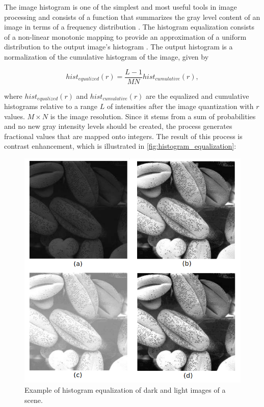 The image histogram is one of the simplest and most useful tools in image processing and consists of a function that summarizes the gray level content of an image in terms of a frequency distribution \cite{castleman1996digital}. The histogram equalization consists of a non-linear monotonic mapping to provide an approximation of a uniform distribution to the output image's histogram \cite{gonzalez2018digital}. The output histogram is a normalization of the cumulative histogram of the image, given by

\begin{equation}
\label{eqn:histogram_equalization}
hist_{equalized}(r) = \frac{L - 1}{MN} hist_{cumulative}(r),
\end{equation}

\noindent where $hist_{equalized}(r)$ and $hist_{cumulative}(r)$ are the equalized and cumulative histograms relative to a range $L$ of intensities after the image quantization with $r$ values. $M \times N$ is the image resolution. Since it stems from a sum of probabilities and no new gray intensity levels should be created, the process generates fractional values that are mapped onto integers. The result of this process is contrast enhancement, which is illustrated in \autoref{fig:histogram_equalization}:

\begin{figure}[htb]
	\centering
	\caption{\label{fig:histogram_equalization} Example of histogram equalization of dark and light images of a scene.} 
	\begin{center}
	    \includegraphics[scale=0.5]{images/histogram_equalization.png}
	\end{center}
	\centering
\end{figure}


